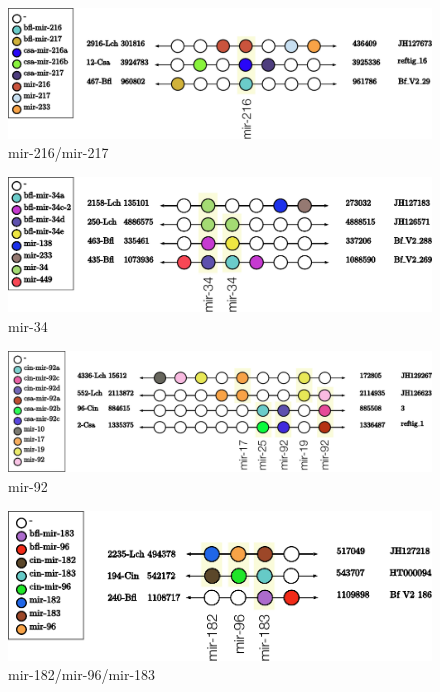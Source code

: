 \documentclass[graybox]{svmult}
\begin{document}
\begin{figure}[ht!]
\sidecaption[t]
\includegraphics[width=\textwidth]{./Images/Cluster_images/mir-217_13D_467}
\caption{mir-216/mir-217}
\label{fig:mir-216}
\end{figure}

\begin{figure}[ht!]
\sidecaption[t]
\includegraphics[width=\textwidth]{./Images/Cluster_images/mir-34_11A_435}
\caption{mir-34}
\label{fig:mir-34}
\end{figure}

\begin{figure}[ht!]
\sidecaption[t]
\includegraphics[width=\textwidth]{./Images/Cluster_images/mir-92_281_4336}
\caption{mir-92}
\label{fig:mir-92}
\end{figure}

\begin{figure}[ht!]
\sidecaption[t]
\includegraphics[width=\textwidth]{./Images/Cluster_images/mir-96_138_240}
\caption{mir-182/mir-96/mir-183}
\label{fig:mir-96}
\end{figure}
\end{document}
